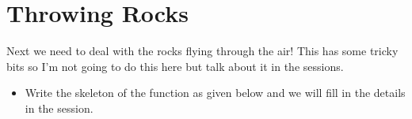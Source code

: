 \documentclass{coderdojo}
\newcommand\TODO[1]{
\begin{itemize}
\item[\todoSymbol] \color{todo} #1
\end{itemize}}
\begin{document}


\section{Throwing Rocks}

Next we need to deal with the rocks flying through the air! This has some tricky bits so I'm not going to do this here but talk about it in the sessions.

\TODO{Write the skeleton of the function  as given below and we will fill in the details in the session.}

\end{document}

